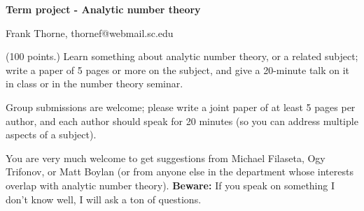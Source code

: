 \documentclass[12pt]{article}
\begin{document}
\setlength{\topmargin}{-2mm}





\author{Term project.}
\begin{center}{\bf Term project - Analytic number theory}
\end{center}
\begin{center}Frank Thorne, thornef@webmail.sc.edu
\end{center}

(100 points.) Learn something about analytic number theory, or a related subject; write a paper
of 5 pages or more on the subject, and give a 20-minute talk on it in class or in the number theory seminar.

Group submissions are welcome; please write a joint paper of at least 5 pages per author, and each author
should speak for 20 minutes (so you can address multiple aspects of a subject).

You are very much welcome to get suggestions from Michael Filaseta, Ogy Trifonov, or Matt Boylan (or from anyone
else in the department whose interests overlap with analytic number theory). {\bf Beware:} If you speak on 
something I don't know well, I will ask a ton of questions.
\end{document}
